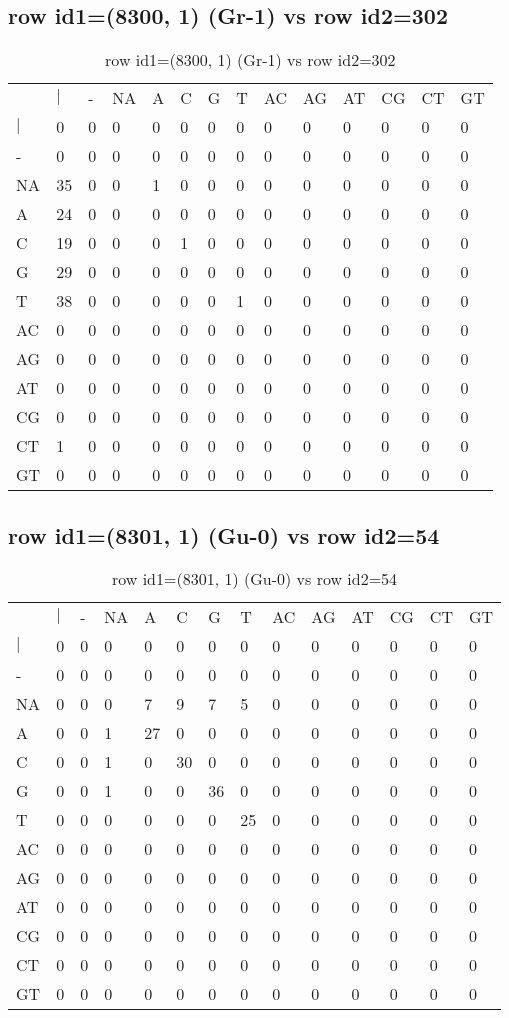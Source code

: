 \subsection{row id1=(8300, 1) (Gr-1) vs row id2=302}
\begin{center}
\begin{longtable}{|l|l|l|l|l|l|l|l|l|l|l|l|l|l|}
\caption{row id1=(8300, 1) (Gr-1) vs row id2=302} \label{table_dm478}\\
\hline
\\
\hline
&$|$&-&NA&A&C&G&T&AC&AG&AT&CG&CT&GT\\
$|$&0&0&0&0&0&0&0&0&0&0&0&0&0\\
-&0&0&0&0&0&0&0&0&0&0&0&0&0\\
NA&35&0&0&1&0&0&0&0&0&0&0&0&0\\
A&24&0&0&0&0&0&0&0&0&0&0&0&0\\
C&19&0&0&0&1&0&0&0&0&0&0&0&0\\
G&29&0&0&0&0&0&0&0&0&0&0&0&0\\
T&38&0&0&0&0&0&1&0&0&0&0&0&0\\
AC&0&0&0&0&0&0&0&0&0&0&0&0&0\\
AG&0&0&0&0&0&0&0&0&0&0&0&0&0\\
AT&0&0&0&0&0&0&0&0&0&0&0&0&0\\
CG&0&0&0&0&0&0&0&0&0&0&0&0&0\\
CT&1&0&0&0&0&0&0&0&0&0&0&0&0\\
GT&0&0&0&0&0&0&0&0&0&0&0&0&0\\
\hline
\end{longtable}
\end{center}

\subsection{row id1=(8301, 1) (Gu-0) vs row id2=54}
\begin{center}
\begin{longtable}{|l|l|l|l|l|l|l|l|l|l|l|l|l|l|}
\caption{row id1=(8301, 1) (Gu-0) vs row id2=54} \label{table_dm480}\\
\hline
\\
\hline
&$|$&-&NA&A&C&G&T&AC&AG&AT&CG&CT&GT\\
$|$&0&0&0&0&0&0&0&0&0&0&0&0&0\\
-&0&0&0&0&0&0&0&0&0&0&0&0&0\\
NA&0&0&0&7&9&7&5&0&0&0&0&0&0\\
A&0&0&1&27&0&0&0&0&0&0&0&0&0\\
C&0&0&1&0&30&0&0&0&0&0&0&0&0\\
G&0&0&1&0&0&36&0&0&0&0&0&0&0\\
T&0&0&0&0&0&0&25&0&0&0&0&0&0\\
AC&0&0&0&0&0&0&0&0&0&0&0&0&0\\
AG&0&0&0&0&0&0&0&0&0&0&0&0&0\\
AT&0&0&0&0&0&0&0&0&0&0&0&0&0\\
CG&0&0&0&0&0&0&0&0&0&0&0&0&0\\
CT&0&0&0&0&0&0&0&0&0&0&0&0&0\\
GT&0&0&0&0&0&0&0&0&0&0&0&0&0\\
\hline
\end{longtable}
\end{center}

